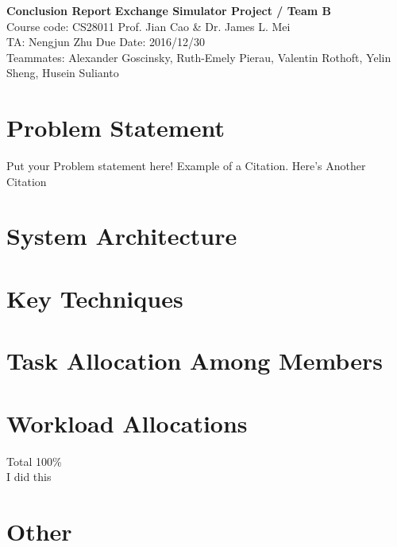 \documentclass[a4paper, 11pt]{article}
\begin{document}
\noindent

\large\textbf{Conclusion Report} 
\hfill \textbf{Exchange Simulator Project / Team B} \\

\normalsize Course code: CS28011 \hfill Prof. Jian Cao \& Dr. James L. Mei\\ 

TA: Nengjun Zhu  \hfill Due Date: 2016/12/30 \\

Teammates: Alexander Goscinsky,
Ruth-Emely Pierau,
Valentin Rothoft,
Yelin Sheng,
Husein Sulianto



\section*{Problem Statement}
Put your Problem statement here! Example of a Citation\cite[p.219]{Robotics}. Here's Another Citation\cite{Flueck}

\section*{System Architecture}
\lipsum[2]

\section*{Key Techniques}
\lipsum[3]

\section*{Task Allocation Among Members}
\lipsum[4]

\section*{Workload Allocations}
Total 100\% \\
I did this

\section*{Other}
\lipsum[7]
\end{document}
